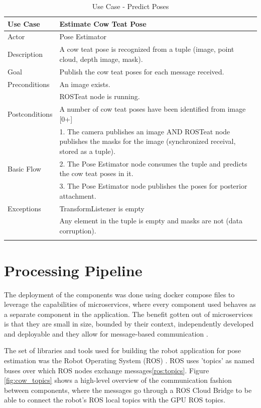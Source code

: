 \begin{longtable}{@{} p{3.5cm} p{10.5cm} @{}} \toprule
\textbf{Use Case}       & \textbf{Estimate Cow Teat Pose} \\ \midrule
Actor                   & Pose Estimator \\ \cmidrule{1-2}
Description             & A cow teat pose is recognized from a tuple (image, point cloud, depth image, mask). \\ \cmidrule{1-2}
Goal                    & Publish the cow teat poses for each message received. \\ \cmidrule{1-2}
Preconditions           & An image exists. \\ 
                        & ROSTeat node is running. \\ \cmidrule{1-2} 
Postconditions          & A number of cow teat poses have been identified from image [0+]\\ \cmidrule{1-2} 
                        & 1. The camera publishes an image AND ROSTeat node publishes the masks for the image (synchronized receival, stored as a tuple). \\ 
Basic Flow              & 2. The Pose Estimator node consumes the tuple and predicts the cow teat poses in it. \\
                        & 3. The Pose Estimator node publishes the poses for posterior attachment. \\ \cmidrule{1-2}
Exceptions             & TransformListener is empty \\ 
                       & Any element in the tuple is empty and masks are not (data corruption). \\ \bottomrule
\caption{Use Case - Predict Poses} \label{tab:tabcu-prop} \\
\end{longtable}
\lipsum[2]

\section{Processing Pipeline}
    The deployment of the components was done using docker compose files to leverage the capabilities of microservices, where every component used behaves as a separate component in the application. The benefit gotten out of microservices is that they are small in size, bounded by their context, independently developed and deployable and they allow for message-based communication%
    . 
    
    The set of libraries and tools used for building the robot application for pose estimation was the Robot Operating System (ROS)%
    . ROS uses 'topics' as named buses over which ROS nodes exchange messages\ref{ros:topics}. %
    Figure \ref{fig:cow_topics} shows a high-level overview of the communication fashion between components, where the messages go through a ROS Cloud Bridge to be able to connect the robot's ROS local topics with the GPU ROS topics. 
  
